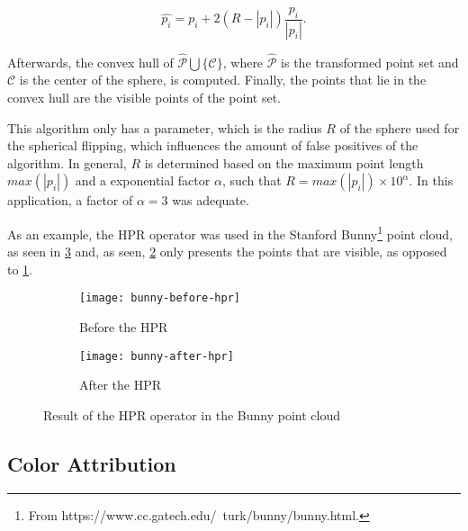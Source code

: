 \begin{equation}
    \label{eqn:spherical-flipping}
    \hat{p_i} = p_i + 2 (R - |p_i|) \frac{p_i}{|p_i|}.
\end{equation}

Afterwards, the convex hull of $\hat{\mathcal{P}} \bigcup \{\mathcal{C}\}$, where $\hat{\mathcal{P}}$ is the transformed point set and $\mathcal{C}$ is the center of the sphere, is computed. Finally, the points that lie in the convex hull are the visible points of the point set.

This algorithm only has a parameter, which is the radius $R$ of the sphere used for the spherical flipping, which influences the amount of false positives of the algorithm. In general, $R$ is determined based on the maximum point length $max(|p_i|)$ and a exponential factor $\alpha$, such that $R = max(|p_i|) \times 10^{\alpha}$. In this application, a factor of $\alpha = 3$ was adequate.

As an example, the HPR operator was used in the Stanford Bunny\footnote{From https://www.cc.gatech.edu/~turk/bunny/bunny.html.} point cloud, as seen in \cref{fig:hpr-operator-bunny} and, as seen, \cref{fig:after-hpr} only presents the points that are visible, as opposed to \cref{fig:before-hpr}.

\begin{figure}[h]
    
    \centering
    \begin{subfigure}{0.5\textwidth}
        \centering
        \texttt{[image: bunny-before-hpr]}
        \caption{Before the HPR}
        \label{fig:before-hpr}
    \end{subfigure}%
    \begin{subfigure}{0.5\textwidth}
        \centering
        \texttt{[image: bunny-after-hpr]}
        \caption{After the HPR}
        \label{fig:after-hpr}
    \end{subfigure}

    \caption{Result of the HPR operator in the Bunny point cloud}
    \label{fig:hpr-operator-bunny}

\end{figure}

\subsection{Color Attribution}

\newcommand\ceil[1]{\lceil #1 \rceil}
\newcommand\floor[1]{\lfloor #1 \rfloor}

